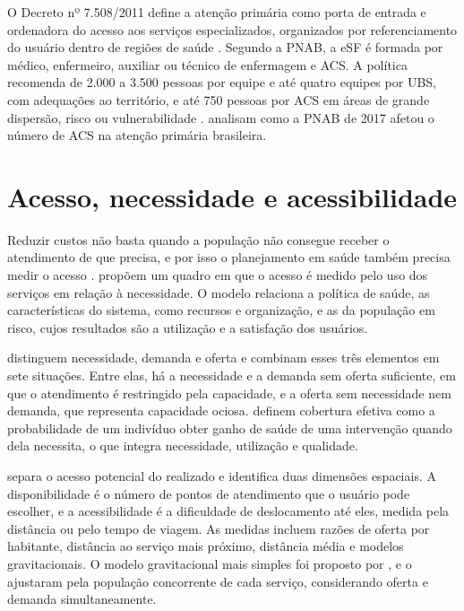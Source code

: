 \documentclass[12pt,a4paper,oneside]{report}
\begin{document}
O Decreto nº 7.508/2011 define a atenção primária como porta de entrada e ordenadora do acesso aos
serviços especializados, organizados por referenciamento do usuário dentro de regiões de saúde
\citep{brasil2011}. Segundo a PNAB, a eSF é formada por
médico, enfermeiro, auxiliar ou técnico de enfermagem e ACS. A política recomenda de 2.000 a 3.500 pessoas
por equipe e até quatro equipes por UBS, com adequações ao território, e até 750 pessoas por ACS em áreas
de grande dispersão, risco ou vulnerabilidade \citep{pnab2017}. \citet{freire2021} analisam como a PNAB
de 2017 afetou o número de ACS na atenção primária brasileira.

\section{Acesso, necessidade e acessibilidade}

Reduzir custos não basta quando a população não consegue receber o atendimento de que precisa, e
por isso o planejamento em saúde também precisa medir o acesso \citep{ahmadi2017}. \citet{aday1974} propõem um quadro em
que o acesso é medido pelo uso dos serviços em relação à necessidade. O modelo relaciona a política de
saúde, as características do sistema, como recursos e organização, e as da população em risco, cujos
resultados são a utilização e a satisfação dos usuários.

\citet{santana2023} distinguem necessidade, demanda e oferta e combinam esses três elementos em sete
situações. Entre elas, há a necessidade e a demanda sem oferta suficiente, em que o atendimento é
restringido pela capacidade, e a oferta sem necessidade nem demanda, que representa capacidade ociosa.
\citet{shengelia2005} definem cobertura efetiva como a probabilidade de um indivíduo obter ganho de saúde
de uma intervenção quando dela necessita, o que integra necessidade, utilização e qualidade.

\citet{guagliardo2004} separa o acesso potencial do realizado e identifica duas dimensões espaciais. A
disponibilidade é o número de pontos de atendimento que o usuário pode escolher, e a acessibilidade é a
dificuldade de deslocamento até eles, medida pela distância ou pelo tempo de viagem. As medidas incluem razões de oferta por
habitante, distância ao serviço mais próximo, distância média e modelos gravitacionais. O modelo
gravitacional mais simples foi proposto por \citet{hansen1959}, e \citet{joseph1982} o ajustaram pela
população concorrente de cada serviço, considerando oferta e demanda simultaneamente.
\end{document}
